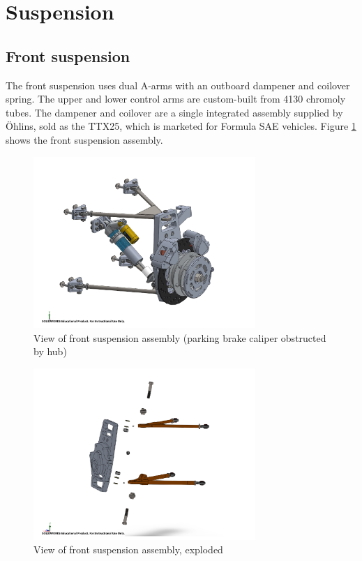 \documentclass[10pt]{article}
\begin{document}
\section{Suspension}
\subsection{Front suspension}
The front suspension uses dual A-arms with an outboard dampener and coilover spring. The upper and lower control arms are custom-built from 4130 chromoly tubes. The dampener and coilover are a single integrated assembly supplied by \"Ohlins, sold as the TTX25, which is marketed for Formula SAE vehicles. Figure \ref{fig:front-suspension} shows the front suspension assembly.

\begin{figure}
\centering
\includegraphics[width=0.75\textwidth]{figures/front-suspension}
\caption{View of front suspension assembly (parking brake caliper obstructed by hub)}
\label{fig:front-suspension}
\end{figure}

\begin{figure}
\centering
\includegraphics[width=0.75\textwidth]{figures/front-suspension-exploded}
\caption{View of front suspension assembly, exploded}
\label{fig:front-suspension-exploded}
\end{figure}
\end{document}
